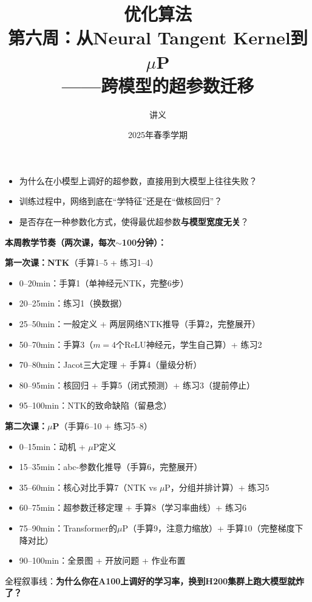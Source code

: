 \documentclass[11pt,a4paper]{article}
\title{\textbf{优化算法} \\ \Large 第六周：从Neural Tangent Kernel到$\mu$P \\ ——跨模型的超参数迁移}
\author{讲义}
\date{2025年春季学期}
\begin{document}
\maketitle

\begin{tcolorbox}[colback=yellow!10,colframe=yellow!60!black,title=\textbf{本周核心问题}]
\begin{itemize}[leftmargin=*]
\item 为什么在小模型上调好的超参数，直接用到大模型上往往失败？
\item 训练过程中，网络到底在``学特征''还是在``做核回归''？
\item 是否存在一种参数化方式，使得最优超参数\textbf{与模型宽度无关}？
\end{itemize}
\end{tcolorbox}

\begin{teachingtip}
\textbf{本周教学节奏（两次课，每次$\sim$100分钟）：}

\textbf{第一次课：NTK}（手算1--5 + 练习1--4）
\begin{itemize}[leftmargin=*]
\item 0--20min：手算1（单神经元NTK，完整6步）
\item 20--25min：练习1（换数据）
\item 25--50min：一般定义 + 两层网络NTK推导（手算2，完整展开）
\item 50--70min：手算3（$m=4$个ReLU神经元，学生自己算）+ 练习2
\item 70--80min：Jacot三大定理 + 手算4（量级分析）
\item 80--95min：核回归 + 手算5（闭式预测）+ 练习3（提前停止）
\item 95--100min：NTK的致命缺陷（留悬念）
\end{itemize}

\textbf{第二次课：$\mu$P}（手算6--10 + 练习5--8）
\begin{itemize}[leftmargin=*]
\item 0--15min：动机 + $\mu$P定义
\item 15--35min：abc-参数化推导（手算6，完整展开）
\item 35--60min：核心对比手算7（NTK vs $\mu$P，分组并排计算）+ 练习5
\item 60--75min：超参数迁移定理 + 手算8（学习率曲线）+ 练习6
\item 75--90min：Transformer的$\mu$P（手算9，注意力缩放）+ 手算10（完整梯度下降对比）
\item 90--100min：全景图 + 开放问题 + 作业布置
\end{itemize}

全程叙事线：\textbf{为什么你在A100上调好的学习率，换到H200集群上跑大模型就炸了？}
\end{teachingtip}
\end{document}
